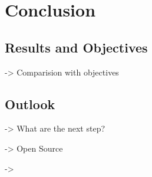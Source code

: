 \chapter{Conclusion}
\section{Results and Objectives}
-> Comparision with objectives 

\section{Outlook}
-> What are the next step? 

-> Open Source 

-> 


